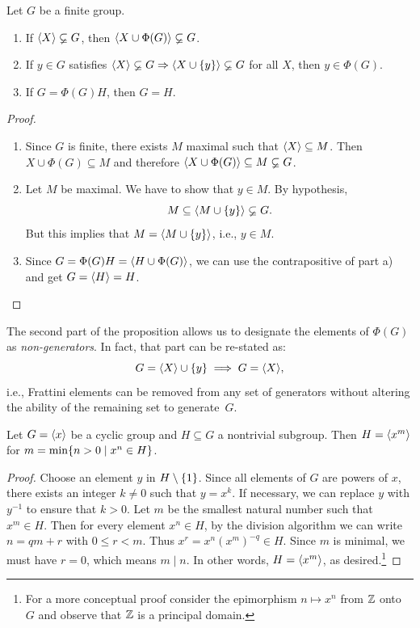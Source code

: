 \begin{prop}\label{frattini} Let\/ $G$ be a finite group.
    \begin{enumerate}[\upshape a)]
        \item If $\langle X\rangle\varsubsetneq G$, then $\langle X\cup\Phi(G)\rangle\varsubsetneq G$.
        \item If\/ $y\in G$ satisfies $\langle X\rangle\varsubsetneq G\Rightarrow\langle X\cup\{y\}\rangle\varsubsetneq G$ for all $X$, then $y\in\Phi(G)$.
        \item If $G=\Phi(G)H$, then $G=H$.
    \end{enumerate}
\end{prop}

\begin{proof}${}$
\begin{enumerate}[\upshape a)]
    \item Since $G$ is finite, there exists $M$ maximal such that $\langle X\rangle\subseteq M$. Then $X\cup\Phi(G)\subseteq M$ and therefore $\langle X\cup\Phi(G)\rangle\subseteq M\varsubsetneq G$.
    \item Let $M$ be maximal. We have to show that $y\in M$. By hypothesis,
    $$
        M\subseteq\langle M\cup\{y\}\rangle\varsubsetneq G.
    $$
    But this implies that $M=\langle M\cup\{y\}\rangle$, i.e., $y\in M$.
    \item Since $G=\Phi(G)H=\langle H\cup\Phi(G)\rangle$, we can use the contrapositive of part a) and get $G=\langle H\rangle= H$.
\end{enumerate}
 \end{proof}

\begin{rem}\label{non-generators}
    The second part of the proposition allows us to designate the elements of\/ $\Phi(G)$ as \textsl{non-generators}. In fact, that part can be re-stated as:
    $$
        G=\langle X\rangle\cup\{y\}\implies G=\langle X\rangle,
    $$
    i.e., Frattini elements can be removed from any set of generators without altering the ability of the remaining set to generate\/~$G$.
\end{rem}

\begin{prop}{}
    Let\/ $G=\langle x\rangle$ be a cyclic group and $H\subseteq G$ a nontrivial subgroup. Then $H=\langle x^m\rangle$ for $m=\min\{n>0\mid x^n\in H\}$.
\end{prop}

\begin{proof} Choose an element $y$ in $H\setminus\{1\}$. Since all elements of $G$ are powers of $x$, there exists an integer $k\ne0$ such that $y=x^k$. If necessary, we can replace $y$ with $y^{-1}$ to ensure that $k>0$. Let $m$ be the smallest natural number such that $x^m\in H$. Then for every element $x^n\in H$, by the division algorithm we can write $n = qm + r$ with $0 \le r < m$. Thus $x^r = x^n(x^m)^{-q} \in H$. Since $m$ is minimal, we must have $r=0$, which means $m \mid n$. In other words, $H=\langle x^m\rangle$, as desired.\footnote{For a more conceptual proof consider the epimorphism $n\mapsto x^n$ from $\mathbb{Z}$ onto $G$ and observe that $\mathbb{Z}$ is a principal domain.}  \end{proof} 


